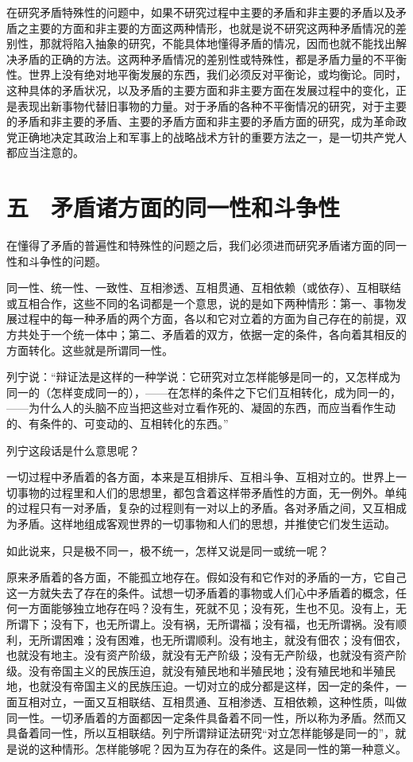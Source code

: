 在研究矛盾特殊性的问题中，如果不研究过程中主要的矛盾和非主要的矛盾以及矛盾之主要的方面和非主要的方面这两种情形，也就是说不研究这两种矛盾情况的差别性，那就将陷入抽象的研究，不能具体地懂得矛盾的情况，因而也就不能找出解决矛盾的正确的方法。这两种矛盾情况的差别性或特殊性，都是矛盾力量的不平衡性。世界上没有绝对地平衡发展的东西，我们必须反对平衡论，或均衡论。同时，这种具体的矛盾状况，以及矛盾的主要方面和非主要方面在发展过程中的变化，正是表现出新事物代替旧事物的力量。对于矛盾的各种不平衡情况的研究，对于主要的矛盾和非主要的矛盾、主要的矛盾方面和非主要的矛盾方面的研究，成为革命政党正确地决定其政治上和军事上的战略战术方针的重要方法之一，是一切共产党人都应当注意的。

\section{五　矛盾诸方面的同一性和斗争性}

在懂得了矛盾的普遍性和特殊性的问题之后，我们必须进而研究矛盾诸方面的同一性和斗争性的问题。

同一性、统一性、一致性、互相渗透、互相贯通、互相依赖（或依存）、互相联结或互相合作，这些不同的名词都是一个意思，说的是如下两种情形：第一、事物发展过程中的每一种矛盾的两个方面，各以和它对立着的方面为自己存在的前提，双方共处于一个统一体中；第二、矛盾着的双方，依据一定的条件，各向着其相反的方面转化。这些就是所谓同一性。

列宁说：“辩证法是这样的一种学说：它研究对立怎样能够是同一的，又怎样成为同一的（怎样变成同一的），——在怎样的条件之下它们互相转化，成为同一的，——为什么人的头脑不应当把这些对立看作死的、凝固的东西，而应当看作生动的、有条件的、可变动的、互相转化的东西。”

列宁这段话是什么意思呢？

一切过程中矛盾着的各方面，本来是互相排斥、互相斗争、互相对立的。世界上一切事物的过程里和人们的思想里，都包含着这样带矛盾性的方面，无一例外。单纯的过程只有一对矛盾，复杂的过程则有一对以上的矛盾。各对矛盾之间，又互相成为矛盾。这样地组成客观世界的一切事物和人们的思想，并推使它们发生运动。

如此说来，只是极不同一，极不统一，怎样又说是同一或统一呢？

原来矛盾着的各方面，不能孤立地存在。假如没有和它作对的矛盾的一方，它自己这一方就失去了存在的条件。试想一切矛盾着的事物或人们心中矛盾着的概念，任何一方面能够独立地存在吗？没有生，死就不见；没有死，生也不见。没有上，无所谓下；没有下，也无所谓上。没有祸，无所谓福；没有福，也无所谓祸。没有顺利，无所谓困难；没有困难，也无所谓顺利。没有地主，就没有佃农；没有佃农，也就没有地主。没有资产阶级，就没有无产阶级；没有无产阶级，也就没有资产阶级。没有帝国主义的民族压迫，就没有殖民地和半殖民地；没有殖民地和半殖民地，也就没有帝国主义的民族压迫。一切对立的成分都是这样，因一定的条件，一面互相对立，一面又互相联结、互相贯通、互相渗透、互相依赖，这种性质，叫做同一性。一切矛盾着的方面都因一定条件具备着不同一性，所以称为矛盾。然而又具备着同一性，所以互相联结。列宁所谓辩证法研究“对立怎样能够是同一的”，就是说的这种情形。怎样能够呢？因为互为存在的条件。这是同一性的第一种意义。

